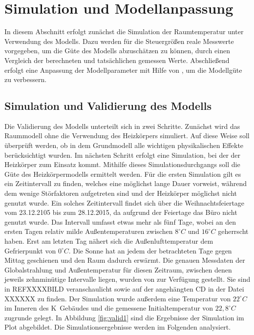 \section{Simulation und Modellanpassung}

In diesem Abschnitt erfolgt zunächst die Simulation der Raumtemperatur unter Verwendung des Modells. Dazu werden für die Steuergrößen reale Messwerte vorgegeben, um die Güte des Modells abzuschätzen zu können, durch einen Vergleich der berechneten und tatsächlichen gemessen Werte. Abschließend erfolgt eine Anpassung der Modellparameter mit Hilfe von \cite{casiopeia}, um die Modellgüte zu verbessern.

\subsection{Simulation und Validierung des Modells}

Die Validierung des Modells unterteilt sich in zwei Schritte. Zunächst wird das Raummodell ohne die Verwendung des Heizkörpers simuliert. Auf diese Weise soll überprüft werden, ob in dem Grundmodell alle wichtigen physikalischen Effekte berücksichtigt wurden. Im nächsten Schritt erfolgt eine Simulation, bei der der Heizkörper zum Einsatz kommt. Mithilfe  dieses Simulationsdurchgangs soll die Güte des Heizkörpermodells ermittelt werden.
Für die ersten Simulation gilt es ein Zeitintervall zu finden, welches eine möglichst lange Dauer vorweist, während dem wenige Störfaktoren aufgetreten sind und der Heizkörper möglichst nicht genutzt wurde. Ein solches Zeitintervall findet sich über die Weihnachtsfeiertage vom 23.12.2105 bis zum 28.12.2015, da aufgrund der Feiertage das Büro nicht genutzt wurde.
Das Intervall umfasst etwas mehr als fünf Tage, wobei an den ersten Tagen relativ milde Außentemperaturen zwischen $8^{\circ}C$ und $16^{\circ}C$ geherrscht haben. Erst am letzten Tag nähert sich die Außenlufttemperatur dem Gefrierpunkt von $0^{\circ}C$. Die Sonne hat an jedem der betrachteten Tage gegen Mittag geschienen und den Raum dadurch erwärmt.
Die genauen Messdaten der Globalstrahlung und Außentemperatur für diesen Zeitraum, zwischen denen jeweils zehnminütige Intervalle liegen, wurden von \cite{wetter} zur Verfügung gestellt. Sie sind in REFXXXXBILD veranschaulicht sowie auf der angehängten CD in der Datei XXXXXX zu finden.
Der Simulation wurde außerdem eine Temperatur von $22^{\circ}C$ im Inneren des K~Gebäudes und die gemessene Initialtemperatur von $22,8^{\circ}C$ zugrunde gelegt. In Abbildung \ref{fig:valid1} sind die Ergebnisse der Simulation im Plot abgebildet. Die Simulationsergebnisse  werden im Folgenden analysiert.


